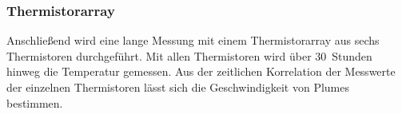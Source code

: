 \subsubsection{Thermistorarray}
Anschließend wird eine lange Messung mit einem Thermistorarray aus sechs Thermistoren durchgeführt.
Mit allen Thermistoren wird über 30~Stunden hinweg die Temperatur gemessen.
Aus der zeitlichen Korrelation der Messwerte der einzelnen Thermistoren lässt sich die Geschwindigkeit von Plumes bestimmen.

